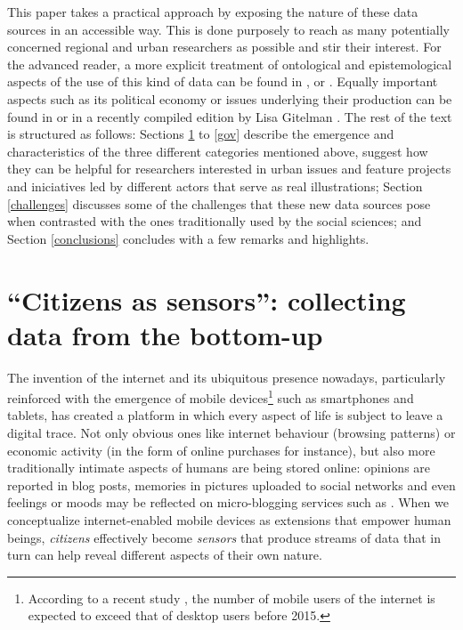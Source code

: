 \documentclass[12pt]{article}
\begin{document}
This paper takes a practical approach by
exposing the nature of these data sources in an accessible way. This is done
purposely to reach as many potentially concerned regional and urban
researchers as possible and stir their interest.
For the advanced reader, a more explicit treatment of ontological and epistemological aspects of the
use of this kind of data can be found in \cite{warfsui2010},
\cite{boydcrawford2012} or \cite{crampton2013geotag}.
Equally important aspects such as its political economy or issues
underlying their production can be found in \cite{leszczynski2012} or in a
recently compiled edition by Lisa Gitelman \citep{gitelman2013oxymoron}.
%
The rest of the text is structured as follows: Sections \ref{sensors} to
\ref{gov} describe the emergence and characteristics of the three
different categories mentioned above, suggest how they can be helpful for
researchers interested in urban issues and feature projects and iniciatives led by
different actors that serve as real illustrations; Section \ref{challenges}
discusses some of the challenges that these new data sources pose when
contrasted with the ones traditionally used by the social sciences; and
Section \ref{conclusions} concludes with a few remarks and highlights.

\section{``Citizens as sensors'': collecting data from the bottom-up}
\label{sensors}
The invention of the internet and its ubiquitous presence nowadays,
particularly reinforced with the emergence of mobile
devices\footnote{According to a recent study \citep{msInternetUsage2012}, the
number of mobile users of the internet is expected to exceed that of desktop
users before 2015.} such as smartphones
and tablets, has created a platform in which every aspect of life is subject
to leave a digital trace.
Not only obvious ones like internet behaviour (browsing patterns) or economic
activity (in the form of online purchases for instance), but also more traditionally
intimate aspects of humans are being stored online: opinions are reported in
blog posts, memories in pictures uploaded to social networks and even feelings
or moods may be reflected on micro-blogging services such as \cite{twitter}.
When we conceptualize internet-enabled mobile devices as
extensions that empower human beings, \emph{citizens} effectively become
\emph{sensors} \citep{goodchild2007vgi} that produce streams of data that in
turn can help reveal different aspects of their own nature.
\end{document}
